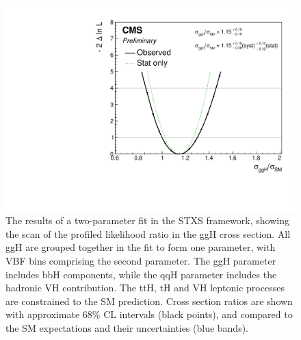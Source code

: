 \begin{figure}[hptb]
\centering
\includegraphics[width=\textwidth]{Figures/Results/ObsStage0_r_ggH.pdf}
\caption{
  The results of a two-parameter fit in the STXS framework,
  showing the scan of the profiled likelihood ratio in the ggH cross section.
  All ggH are grouped together in the fit to form one parameter, 
  with VBF bins comprising the second parameter.
  The ggH parameter includes bbH components, 
  while the qqH parameter includes the hadronic VH contribution. 
  The ttH, tH and VH leptonic processes are constrained to the SM prediction. 
  Cross section ratios are shown with approximate 68\% CL intervals (black points), 
  and compared to the SM expectations and their uncertainties (blue bands).
}
\label{fig:results_Stage0_ggH}
\end{figure}

